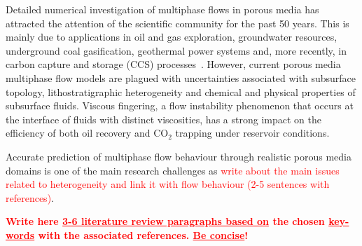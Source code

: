 \documentclass[preprint,authoryear,12pt]{elsarticle}
\newcommand{\red}{\textcolor{red}}
\begin{document}
Detailed numerical investigation of multiphase flows in porous media has attracted the attention of the scientific community for the past 50 years. This is mainly due to applications in oil and gas exploration, groundwater resources, underground coal gasification, geothermal power systems and, more recently, in carbon capture and storage (CCS) processes~\citep{spycher_2003, chen_2006, self_2012, pruess_1990c, white_1981, jiang_2011}. However, current porous media multiphase flow models are plagued with uncertainties associated with subsurface topology, lithostratigraphic heterogeneity and chemical and physical properties of subsurface fluids. Viscous fingering, a flow instability phenomenon that occurs at the interface of fluids with distinct viscosities, has a strong impact on the efficiency of both oil recovery and CO$_{2}$ trapping under reservoir conditions.

Accurate prediction of multiphase flow behaviour through realistic porous media domains is one of the main research challenges as \red{write about the main issues related to heterogeneity and link it with flow behaviour (2-5 sentences with references)}. 

\red{\bf Write here \underline{3-6 literature review paragraphs based on} the chosen \underline{key-words} with the associated references. \underline{Be concise}!}

\end{document}
